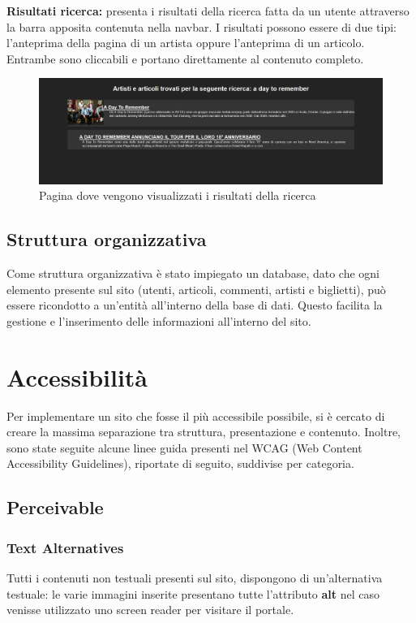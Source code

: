 \documentclass[10pt, a4paper]{article}
\begin{document}
\begin{flushleft} \textbf{Risultati ricerca: }presenta i risultati della ricerca fatta da un utente attraverso la barra apposita contenuta nella navbar.
I risultati possono essere di due tipi: l’anteprima della pagina di un artista oppure l’anteprima di un articolo.
Entrambe sono cliccabili e portano direttamente al contenuto completo.
\end{flushleft}
\begin{figure}[h!]
 \centering
  \includegraphics[width=1\textwidth]{Images/ricerca.png}
  \caption{Pagina dove vengono visualizzati i risultati della ricerca}
  \label{fig:ricerca}
\end{figure}
\newpage
\subsection{Struttura organizzativa}
Come struttura organizzativa è stato impiegato un database, dato che ogni elemento presente sul sito (utenti, articoli, commenti, artisti e biglietti), può essere ricondotto a un'entità all'interno della base di dati. Questo facilita la gestione e l'inserimento delle informazioni all'interno del sito.
\section{Accessibilità}
Per implementare un sito che fosse il più accessibile possibile, si è cercato di creare la massima separazione tra struttura, presentazione e contenuto. Inoltre, sono state seguite alcune linee guida presenti nel WCAG (Web Content Accessibility Guidelines), riportate di seguito, suddivise per categoria.

\subsection{Perceivable}

\subsubsection{Text Alternatives}
Tutti i contenuti non testuali presenti sul sito, dispongono di un'alternativa testuale: le varie immagini inserite presentano tutte l'attributo \textbf{alt} nel caso venisse utilizzato uno screen reader per visitare il portale.
\end{document}
